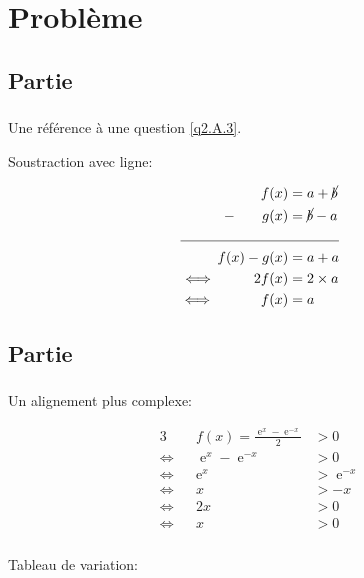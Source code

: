 \documentclass[11pt,a4paper]{article}
\DeclareMathOperator{\e}{e}
\begin{document}
\section{Problème}

\subsection{Partie}

\subsubsection{}
Une référence à une question \ref{q2.A.3}.

Soustraction avec ligne:

\begin{align*}
  f(x)                            & = a+\cancel{b} \\
  - \;\;\;\;\;\;\;g(x)            & = \cancel{b}-a \\
  \cline{1-3}
  f(x)-g(x)                       & = a+a          \\
  \iff \;\;\;\;\;\;\;\;\;2f(x)    & = 2\times a    \\
  \iff \;\;\;\;\;\;\;\;\;\;\;f(x) & = a            \\
\end{align*}

\subsection{Partie}
\subsubsection{}

Un alignement plus complexe:

\begin{alignat*}{3}
       &   & f(x)=\frac{\e^x-\e^{-x}}{2} & >0       \\
  \iff &   & \e^x-\e^{-x}                & >0       \\
  \iff &   & \e^x                        & >\e^{-x} \\
  \iff &   & x                           & >-x      \\
  \iff &   & 2x                          & >0       \\
  \iff &   & x                           & >0
\end{alignat*}

\subsubsection{}

Tableau de variation:\\

\end{document}

